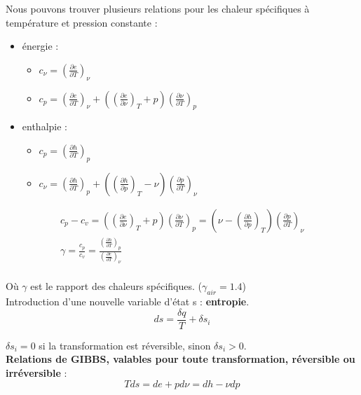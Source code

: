 \documentclass[../main.tex]{subfiles}
\begin{document}
Nous pouvons trouver plusieurs relations pour les chaleur spécifiques à température et pression constante : \begin{itemize}
    \item énergie : \begin{itemize}
        \item $c_\nu = (\frac{\partial e}{\partial T})_\nu$\\
        \item $c_p = (\frac{\partial e}{\partial T})_\nu + ((\frac{\partial e}{\partial \nu})_T+p)(\frac{\partial \nu}{\partial T})_p $\\
    \end{itemize}
    \item enthalpie : \begin{itemize}
        \item $c_p = (\frac{\partial h}{\partial T})_p$\\
        \item $c_\nu = (\frac{\partial h}{\partial T})_p + ((\frac{\partial h}{\partial p})_T-\nu)(\frac{\partial p}{\partial T})_\nu$\\
    \end{itemize}
\end{itemize}

\begin{equation}
    \begin{gathered}
        c_p-c_v =  ((\frac{\partial e}{\partial \nu})_T+p)(\frac{\partial \nu}{\partial T})_p = (\nu - (\frac{\partial h}{\partial p})_T)(\frac{\partial p}{\partial T})_\nu \\
        \gamma = \frac{c_p}{c_v} = \frac{(\frac{\partial h}{\partial T})_p}{(\frac{\partial e}{\partial T})_\nu}\\
    \end{gathered}
\end{equation}

Où $\gamma$ est le rapport des chaleurs spécifiques. ($\gamma_{air} = 1.4$)\\

Introduction d'une nouvelle variable d'état s : \textbf{entropie}.\begin{equation}
    ds = \frac{\delta q}{T} + \delta s_i
\end{equation}

$\delta s_i = 0$ si la transformation est réversible, sinon $\delta s_i >0$.\\

\textbf{Relations de GIBBS, valables pour toute transformation, réversible ou irréversible} : \begin{equation}
    Tds = de + pd\nu = dh - \nu dp
\end{equation}
\end{document}
